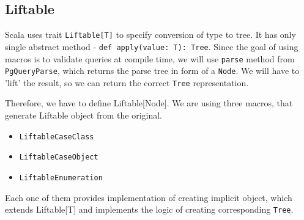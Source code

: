 \subsection{Liftable}
Scala uses trait \texttt{Liftable[T]} to specify conversion of type to tree. It has only single abstract method - \texttt{def apply(value: T): Tree}. Since the goal of using macros is to validate queries at compile time, we will use \texttt{parse} method from \texttt{PgQueryParse}, which returns the parse tree in form of a \texttt{Node}. We will have to 'lift' the result, so we can return the correct \texttt{Tree} representation. \cite{Liftable}

Therefore, we have to define Liftable[Node]. We are using three macros, that generate Liftable object from the original. 
\begin{itemize}
    \item \texttt{LiftableCaseClass}
    \item \texttt{LiftableCaseObject}
    \item \texttt{LiftableEnumeration}
\end{itemize}
Each one of them provides implementation of creating implicit object, which extends Liftable[T] and implements the logic of creating corresponding \texttt{Tree}.
